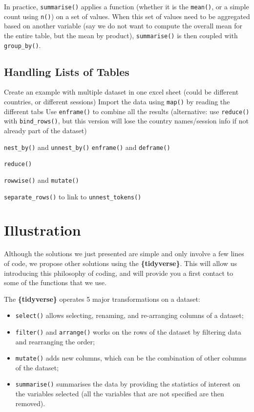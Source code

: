 \documentclass[
]{book}
\providecommand{\tightlist}{%
  \setlength{\itemsep}{0pt}\setlength{\parskip}{0pt}}
\begin{document}
In practice, \texttt{summarise()} applies a function (whether it is the \texttt{mean()}, or a simple count using \texttt{n()}) on a set of values. When this set of values need to be aggregated based on another variable (say we do not want to compute the overall mean for the entire table, but the mean by product), \texttt{summarise()} is then coupled with \texttt{group\_by()}.

\hypertarget{handling-lists-of-tables}{%
\subsection{Handling Lists of Tables}\label{handling-lists-of-tables}}

Create an example with multiple dataset in one excel sheet (could be different countries, or different sessions)
Import the data using \texttt{map()} by reading the different tabs
Use \texttt{enframe()} to combine all the results
(alternative: use \texttt{reduce()} with \texttt{bind\_rows()}, but this version will lose the country names/session info if not already part of the dataset)

\texttt{nest\_by()} and \texttt{unnest\_by()}
\texttt{enframe()} and \texttt{deframe()}

\texttt{reduce()}

\texttt{rowwise()} and \texttt{mutate()}

\texttt{separate\_rows()} to link to \texttt{unnest\_tokens()}

\hypertarget{illustration}{%
\section{Illustration}\label{illustration}}

Although the solutions we just presented are simple and only involve a few lines of code, we propose other solutions using the \textbf{\{tidyverse\}}. This will allow us introducing this philosophy of coding, and will provide you a first contact to some of the functions that we use.

The \textbf{\{tidyverse\}} operates 5 major transformations on a dataset:

\begin{itemize}
\tightlist
\item
  \texttt{select()} allows selecting, renaming, and re-arranging columns of a dataset;
\item
  \texttt{filter()} and \texttt{arrange()} works on the rows of the dataset by filtering data and rearranging the order;
\item
  \texttt{mutate()} adds new columns, which can be the combination of other columns of the dataset;
\item
  \texttt{summarise()} summarises the data by providing the statistics of interest on the variables selected (all the variables that are not specified are then removed).
\end{itemize}
\end{document}

